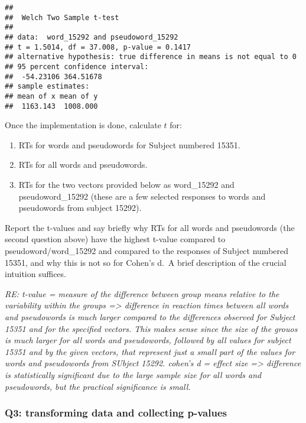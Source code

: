 \documentclass[
]{article}
\providecommand{\tightlist}{%
  \setlength{\itemsep}{0pt}\setlength{\parskip}{0pt}}
\begin{document}
\begin{verbatim}
## 
##  Welch Two Sample t-test
## 
## data:  word_15292 and pseudoword_15292
## t = 1.5014, df = 37.008, p-value = 0.1417
## alternative hypothesis: true difference in means is not equal to 0
## 95 percent confidence interval:
##  -54.23106 364.51678
## sample estimates:
## mean of x mean of y 
##  1163.143  1008.000
\end{verbatim}

Once the implementation is done, calculate \(t\) for:

\begin{enumerate}
\def\labelenumi{\arabic{enumi}.}
\tightlist
\item
  RTs for words and pseudowords for Subject numbered 15351.
\item
  RTs for all words and pseudowords.
\item
  RTs for the two vectors provided below as word\_15292 and
  pseudoword\_15292 (these are a few selected responses to words and
  pseudowords from subject 15292).
\end{enumerate}

Report the t-values and say briefly why RTs for all words and
pseudowords (the second question above) have the highest t-value
compared to pseudoword/word\_15292 and compared to the responses of
Subject numbered 15351, and why this is not so for Cohen's d.~A brief
description of the crucial intuition suffices.

\emph{RE: t-value = measure of the difference between group means
relative to the variability within the groups =\textgreater{} difference
in reaction times between all words and pseudowords is much larger
compared to the differences observed for Subject 15351 and for the
specified vectors. This makes sense since the size of the grouos is much
larger for all words and pseudowords, followed by all values for subject
15351 and by the given vectors, that represent just a small part of the
values for words and pseudowords from SUbject 15292. cohen's d = effect
size =\textgreater{} difference is statistically significant due to the
large sample size for all words and pseudowords, but the practical
significance is small. }

\hypertarget{q3-transforming-data-and-collecting-p-values}{%
\subsubsection{Q3: transforming data and collecting
p-values}\label{q3-transforming-data-and-collecting-p-values}}
\end{document}
